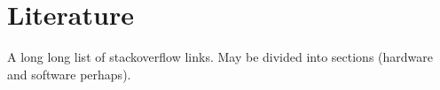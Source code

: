 \chapter{Literature}

A long long list of stackoverflow links.
May be divided into sections (hardware and software perhaps).